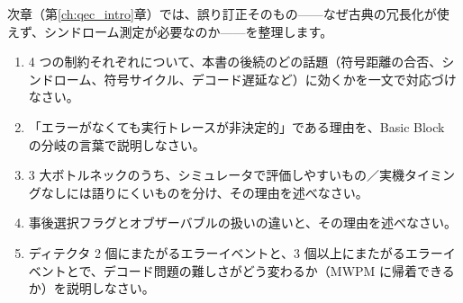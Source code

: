 次章（第\ref{ch:qec_intro}章）では、誤り訂正そのもの——なぜ古典の冗長化が使えず、シンドローム測定が必要なのか——を整理します。

\begin{exercise}
  \begin{enumerate}
    \item 4 つの制約それぞれについて、本書の後続のどの話題（符号距離の合否、シンドローム、符号サイクル、デコード遅延など）に効くかを一文で対応づけなさい。
    \item 「エラーがなくても実行トレースが非決定的」である理由を、Basic Block の分岐の言葉で説明しなさい。
    \item 3 大ボトルネックのうち、シミュレータで評価しやすいもの／実機タイミングなしには語りにくいものを分け、その理由を述べなさい。
    \item 事後選択フラグとオブザーバブルの扱いの違いと、その理由を述べなさい。
    \item ディテクタ 2 個にまたがるエラーイベントと、3 個以上にまたがるエラーイベントとで、デコード問題の難しさがどう変わるか（MWPM に帰着できるか）を説明しなさい。
  \end{enumerate}
\end{exercise}
